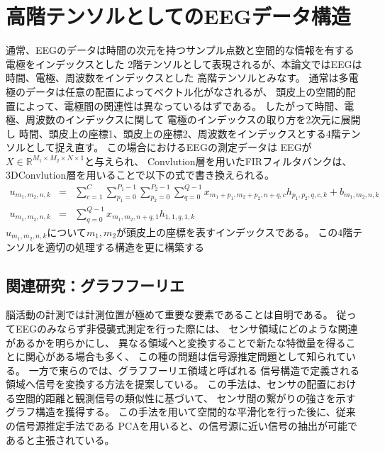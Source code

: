 \section{\rm 高階テンソルとしてのEEG\mc データ構造}
通常、EEGのデータは時間の次元を持つサンプル点数と空間的な情報を有する電極をインデックスとした
2階テンソルとして表現されるが、本論文ではEEGは時間、電極、周波数をインデックスとした
高階テンソルとみなす。
通常は多電極のデータは任意の配置によってベクトル化がなされるが、
頭皮上の空間的配置によって、電極間の関連性は異なっているはずである。
したがって時間、電極、周波数のインデックスに関して
電極のインデックスの取り方を2次元に展開し
時間、頭皮上の座標1、頭皮上の座標2、周波数をインデックスとする4階テンソルとして捉え直す。
この場合におけるEEGの測定データは
EEGが\(X\in \mathbb R^{M_1\times M_2\times N\times 1}\)と与えられ、
Convlution層を用いたFIRフィルタバンクは、3DConvlution層を用いることで以下の式で書き換えられる。
\begin{eqnarray}
    u_{m_1,m_2,n,k}& = &\sum_{c=1}^C\sum_{p_1=0}^{P_1-1}\sum_{p_2=0}^{P_2-1}\sum_{q=0}^{Q-1} x_{m_1+p_1,m_2+p_2,n+q,c} h_{p_1,p_2,q,c,k} + b_{m_1,m_2,n,k}\\
    u_{m_1,m_2,n,k}& = &\sum_{q=0}^{Q-1} x_{m_1,m_2,n+q,1} h_{1,1,q,1,k}
    \label{eq:pseudoFIR3D}
\end{eqnarray} 
\(u_{m_1,m_2,n,k}\)について\(m_1,m_2\)が頭皮上の座標を表すインデックスである。
この\(4\)階テンソルを適切の処理する構造を更に構築する

\subsection{\mc 関連研究：\rm グラフフーリエ}
脳活動の計測では計測位置が極めて重要な要素であることは自明である。
従ってEEGのみならず非侵襲式測定を行った際には、
センサ領域にどのような関連があるかを明らかにし、
異なる領域へと変換することで新たな特徴量を得ることに関心がある場合も多く、
この種の問題は信号源推定問題として知られている。
一方で東らの\cite{グラフフーリエ}では、グラフフーリエ領域と呼ばれる
信号構造で定義される領域へ信号を変換する方法を提案している。
この手法は、センサの配置における空間的距離と観測信号の類似性に基づいて、
センサ間の繋がりの強さを示すグラフ構造を獲得する。
この手法を用いて空間的な平滑化を行った後に、従来の信号源推定手法である
PCAを用いると、の信号源に近い信号の抽出が可能であると主張されている。